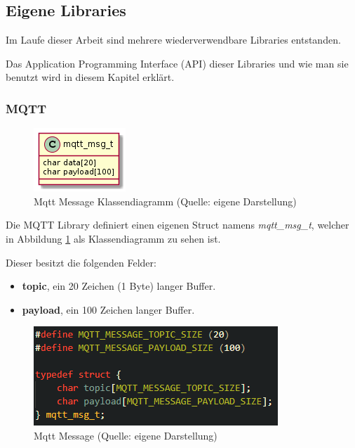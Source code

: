 \subsection{Eigene Libraries}\label{sec:own-libraries}

Im Laufe dieser Arbeit sind mehrere wiederverwendbare Libraries entstanden.

Das Application Programming Interface (API) dieser Libraries und wie man sie benutzt wird in diesem Kapitel erklärt.

\subsubsection{MQTT}\label{sec:own-libraries-mqtt}

\begin{figure}[H]
    \begin{center}
        \includegraphics[scale=1]{diagrams/mqtt_msg_t.png}
        \caption{Mqtt Message Klassendiagramm (Quelle: eigene Darstellung)}
        \label{abb:mqtt_msg_t_diagram}
    \end{center}    
\end{figure}

Die MQTT Library definiert einen eigenen Struct namens \textit{mqtt\_msg\_t}, welcher in Abbildung \ref{abb:mqtt_msg_t_diagram} als Klassendiagramm zu sehen ist.

Dieser besitzt die folgenden Felder:

\begin{itemize}
    \item \textbf{topic}, ein 20 Zeichen (1 Byte) langer Buffer.
    \item \textbf{payload}, ein 100 Zeichen langer Buffer.
\end{itemize}

\begin{figure}[H]
    \begin{center}
        \includegraphics[scale=1]{images/mqtt_msg_t.png}
        \caption{Mqtt Message (Quelle: eigene Darstellung)}
        \label{abb:mqtt_msg_t}
    \end{center}
\end{figure}

